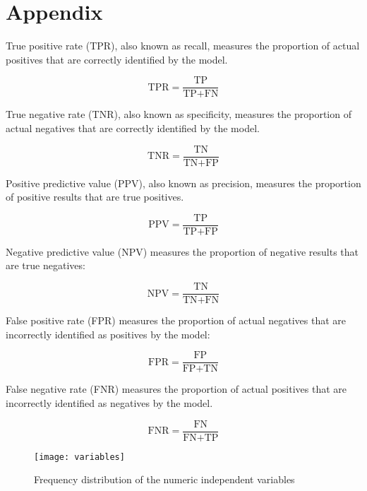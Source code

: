 \newpage

\renewcommand{\thetable}{A\arabic{table}}
\renewcommand{\thefigure}{A\arabic{figure}}

\setcounter{table}{0}
\setcounter{figure}{0}


\section{Appendix}\label{appendix}




True positive rate (TPR), also known as recall, measures the proportion of actual positives that are correctly identified by the model.

\begin{equation}
\text{TPR} = \frac{\text{TP}}{\text{TP} + \text{FN}}
\end{equation}

True negative rate (TNR), also known as specificity, measures the proportion of actual negatives that are correctly identified by the model.

\begin{equation}
\text{TNR} = \frac{\text{TN}}{\text{TN} + \text{FP}}
\end{equation}

Positive predictive value (PPV), also known as precision, measures the proportion of positive results that are true positives.

\begin{equation}
\text{PPV} = \frac{\text{TP}}{\text{TP} + \text{FP}}
\end{equation}

Negative predictive value (NPV) measures the proportion of negative results that are true negatives: 

\begin{equation}
\text{NPV} = \frac{\text{TN}}{\text{TN} + \text{FN}}
\end{equation}

False positive rate (FPR) measures the proportion of actual negatives that are incorrectly identified as positives by the model:

\begin{equation}
\text{FPR} = \frac{\text{FP}}{\text{FP} + \text{TN}}
\end{equation}

False negative rate (FNR) measures the proportion of actual positives that are incorrectly identified as negatives by the model.

\begin{equation}
    \text{FNR} = \frac{\text{FN}}{\text{FN} + \text{TP}}
\end{equation}





\begin{figure}[H]
    \centering  
    \texttt{[image: variables]}
    \caption{Frequency distribution of the numeric independent variables}
    \label{fig:variable}
\end{figure}